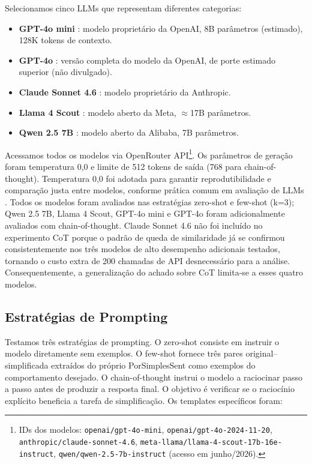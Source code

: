 \documentclass[a4paper, twocolumn, 11pt, twoside]{article}
\begin{document}
Selecionamos cinco LLMs que representam diferentes categorias:

\begin{itemize}
    \item \textbf{GPT-4o mini} \citep{openai2024gpt4o}: modelo
        proprietário da OpenAI, 8B parâmetros (estimado), 128K tokens
        de contexto.
    \item \textbf{GPT-4o} \citep{openai2024gpt4o}: versão completa do
        modelo da OpenAI, de porte estimado superior (não divulgado).
    \item \textbf{Claude Sonnet 4.6} \citep{anthropic2026claude}: modelo
        proprietário da Anthropic.
    \item \textbf{Llama 4 Scout} \citep{meta2025llama4}: modelo aberto da
        Meta, $\approx$17B parâmetros.
    \item \textbf{Qwen 2.5 7B} \citep{bai2023qwen}: modelo aberto da
        Alibaba, 7B parâmetros.
\end{itemize}

Acessamos todos os modelos via OpenRouter API\footnote{IDs dos modelos: \texttt{openai/gpt-4o-mini}, \texttt{openai/gpt-4o-2024-11-20}, \texttt{anthropic/claude-sonnet-4.6}, \texttt{meta-llama/llama-4-scout-17b-16e-instruct}, \texttt{qwen/qwen-2.5-7b-instruct} (acesso em junho/2026).}.
Os parâmetros de geração foram temperatura 0,0 e limite de 512 tokens de
saída (768 para chain-of-thought). Temperatura 0,0 foi adotada para
garantir reprodutibilidade e comparação justa entre modelos, conforme
prática comum em avaliação de LLMs \citep{zhao2021calibrate}. Todos os modelos foram
avaliados nas estratégias zero-shot e few-shot (k=3); Qwen 2.5 7B,
Llama 4 Scout, GPT-4o mini e GPT-4o foram adicionalmente avaliados com
chain-of-thought. Claude Sonnet 4.6 não foi incluído no experimento
CoT porque o padrão de queda de similaridade já se confirmou
consistentemente nos três modelos de alto desempenho adicionais
testados, tornando o custo extra de 200 chamadas de API
desnecessário para a análise. Consequentemente, a generalização
do achado sobre CoT limita-se a esses quatro modelos.

\subsection{Estratégias de Prompting}

Testamos três estratégias de prompting. O zero-shot consiste em
instruir o modelo diretamente sem exemplos. O few-shot
\citep{brown2020} fornece três pares original--simplificada extraídos
do próprio PorSimplesSent como exemplos do comportamento desejado. O
chain-of-thought \citep{wei2022} instrui o modelo a raciocinar passo a
passo antes de produzir a resposta final. O objetivo é verificar
se o raciocínio explícito beneficia a tarefa de simplificação. Os
templates específicos foram:
\end{document}

